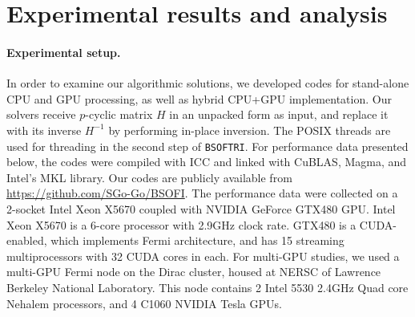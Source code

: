 \documentclass{llncs}
\newcommand{\MKL}{{\sc MKL}\xspace}
\newcommand{\Blas}{{\sc BLAS}\xspace}
\newcommand{\Cuda}{{\sc CUDA}\xspace}
\newcommand{\CuBlas}{{\sc Cu\Blas}\xspace}
\newcommand{\Magma}{{\sc Magma}\xspace}
\newcommand{\Bsoftri}{\texttt{BSOFTRI}\xspace}
\newcommand{\Gemm}{\texttt{DGEMM}\xspace}
\begin{document}
\section{Experimental results and analysis}
\label{sec:results}


\paragraph{Experimental setup.}
\label{sec:experimental_setup}
%
In order to examine our algorithmic solutions, 
we developed codes for 
stand-alone CPU and GPU processing, 
as well as hybrid CPU+GPU implementation.
Our solvers receive $p$-cyclic matrix $H$ in an unpacked form as input, 
and replace it with its inverse $H^{-1}$ 
by performing in-place inversion. 
The POSIX threads are used for threading in the second step of \Bsoftri.
For performance data presented below, the codes were compiled with ICC  %
and linked with \CuBlas, \Magma, and Intel's MKL library. %
Our codes are publicly available from
\url{https://github.com/SGo-Go/BSOFI}.
The performance data were collected on a 2-socket Intel Xeon X5670 
coupled with NVIDIA GeForce GTX480 GPU.
Intel Xeon X5670 is a 6-core processor with 2.9GHz clock rate.
GTX480 is a \Cuda-enabled, which implements Fermi architecture, 
and has 15 streaming multiprocessors with 32 \Cuda cores in each.
For multi-GPU studies, we used a multi-GPU Fermi node on the Dirac cluster,
housed at NERSC of Lawrence Berkeley National Laboratory.
This node contains 2 Intel 5530 2.4GHz Quad core Nehalem processors, 
and 4 C1060 NVIDIA Tesla GPUs.
\end{document}
